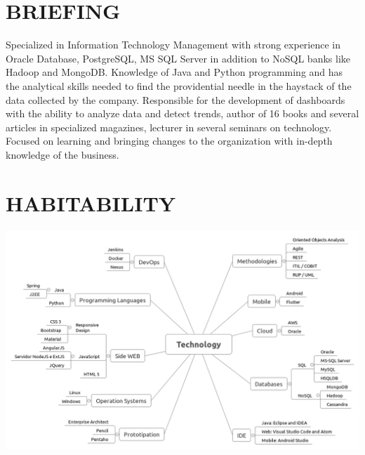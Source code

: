 \documentclass{res}
\begin{document}
	
	\thispagestyle{empty} %
	\address{{\bf Brazil - DF - Brasília} -- Asa Norte -- 70757-120 \\
		Cel Phone. (+55061) 99874.0763 -- Phone (+55061) 3201.5834 \\
		fernando.anselmo74@gmail.com}
	
	\begin{resume}
		
		\section{BRIEFING}
		\vspace{8pt}
		Specialized in Information Technology Management with strong experience in Oracle Database, PostgreSQL, MS SQL Server in addition to NoSQL banks like Hadoop and MongoDB. Knowledge of Java and Python programming and has the analytical skills needed to find the providential needle in the haystack of the data collected by the company. Responsible for the development of dashboards with the ability to analyze data and detect trends, author of 16 books and several articles in specialized magazines, lecturer in several seminars on technology. Focused on learning and bringing changes to the organization with in-depth knowledge of the business.
		
		\section{HABITABILITY}
		\vspace{8pt}
		\includegraphics[width=1.0\textwidth]{imagens/technology}
		

\end{resume}
\end{document}

